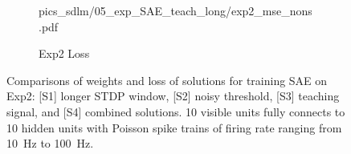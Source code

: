 \begin{figure}
\begin{subfigure}[c]{0.48\textwidth}
{			{pics_sdlm/05_exp_SAE_teach_long/exp2_mse_nons.pdf}}\\
		\caption{Exp2 Loss}
	\end{subfigure}%
	\DIFdelbeginFL %
\DIFdelendFL \DIFaddbeginFL \caption[Comparisons of solutions in training SAE.]{\DIFaddendFL Comparisons of weights and loss of solutions for training SAE on Exp2: [S1] longer STDP window, [S2] noisy threshold, [S3] teaching signal, and [S4] combined solutions. 10 visible units fully connects to 10 hidden units with Poisson spike trains of firing rate ranging from 10~Hz to 100~Hz.}
	\label{fig:sols_ae}
\end{figure}

